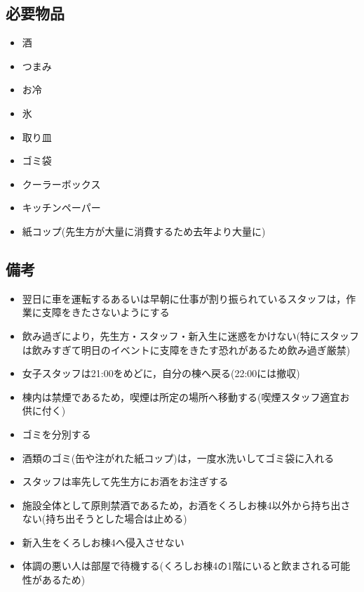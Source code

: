 \subsection{必要物品}
\begin{itemize}
  \item 酒
  \item つまみ
  \item お冷
  \item 氷
  \item 取り皿
  \item ゴミ袋
  \item クーラーボックス
  \item キッチンペーパー
  \item 紙コップ(先生方が大量に消費するため去年より大量に)
\end{itemize}


\subsection{備考}
\begin{itemize}
	\item 翌日に車を運転するあるいは早朝に仕事が割り振られているスタッフは，作業に支障をきたさないようにする
	\item 飲み過ぎにより，先生方・スタッフ・新入生に迷惑をかけない(特にスタッフは飲みすぎて明日のイベントに支障をきたす恐れがあるため飲み過ぎ厳禁)
	\item 女子スタッフは21:00をめどに，自分の棟へ戻る(22:00には撤収)
	\item 棟内は禁煙であるため，喫煙は所定の場所へ移動する(喫煙スタッフ適宜お供に付く)
	\item ゴミを分別する
	\item 酒類のゴミ(缶や注がれた紙コップ)は，一度水洗いしてゴミ袋に入れる
	\item スタッフは率先して先生方にお酒をお注ぎする
	\item 施設全体として原則禁酒であるため，お酒をくろしお棟4以外から持ち出さない(持ち出そうとした場合は止める)
	\item 新入生をくろしお棟4へ侵入させない
  \item 体調の悪い人は部屋で待機する(くろしお棟4の1階にいると飲まされる可能性があるため)
\end{itemize}

%
